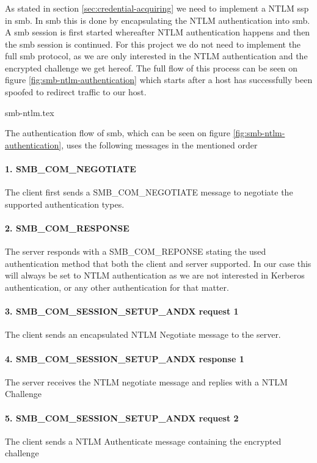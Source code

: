 \documentclass{article}
\begin{document}
\subsubsection{}
As stated in section \ref{sec:credential-acquiring} we need to implement a NTLM \gls{ssp} in \gls{smb}. In \gls{smb} this is done by encapsulating the NTLM authentication into \gls{smb}.
A \gls{smb} session is first started whereafter NTLM authentication happens and then the \gls{smb} session is continued. For this project we do not need to implement the full \gls{smb} protocol, as we are only interested in the NTLM authentication and the encrypted challenge we get hereof. The full flow of this process can be seen on figure \ref{fig:smb-ntlm-authentication} which starts after a host has successfully been spoofed to redirect traffic to our host.

{smb-ntlm.tex}

The authentication flow of \gls{smb}, which can be seen on figure \ref{fig:smb-ntlm-authentication}, uses the following messages in the mentioned order
\paragraph{1. SMB\_COM\_NEGOTIATE} The client first sends a SMB\_COM\_NEGOTIATE message to negotiate the supported authentication types.
\paragraph{2. SMB\_COM\_RESPONSE} The server responds with a SMB\_COM\_REPONSE stating the used authentication method that both the client and server supported. In our case this will always be set to NTLM authentication as we are not interested in Kerberos authentication, or any other authentication for that matter.
\paragraph{3. SMB\_COM\_SESSION\_SETUP\_ANDX request 1} The client sends an encapsulated NTLM Negotiate message to the server.
\paragraph{4. SMB\_COM\_SESSION\_SETUP\_ANDX response 1} The server receives the NTLM negotiate message and replies with a NTLM Challenge
\paragraph{5. SMB\_COM\_SESSION\_SETUP\_ANDX request 2} The client sends a NTLM Authenticate message containing the encrypted challenge
\end{document}

